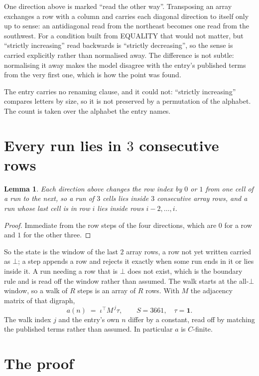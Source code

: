 \documentclass[11pt,a4paper]{article}
\theoremstyle{plain}
\newtheorem{lemma}[theorem]{Lemma}
\theoremstyle{definition}
\begin{document}
One direction above is marked ``read the other way''. Transposing an array exchanges a row with
a column and carries each diagonal direction to itself only up to sense: an antidiagonal read
from the northeast becomes one read from the southwest. For a condition built from EQUALITY
that would not matter, but ``strictly increasing'' read backwards is ``strictly decreasing'',
so the sense is carried explicitly rather than normalised away. The
difference is not subtle: normalising it away makes the model disagree with the entry's
published terms from the very first one, which is how the point was found.

The entry carries no renaming clause, and it could not: ``strictly increasing'' compares
letters by size, so it is not preserved by a permutation of the alphabet. The count is taken
over the alphabet the entry names.

\section{Every run lies in $3$ consecutive rows}

\begin{lemma}\label{lem:win}
Each direction above changes the row index by $0$ or $1$ from one cell of a run to the next, so
a run of $3$ cells lies inside $3$ consecutive array rows, and a run whose last cell is in
row $i$ lies inside rows $i-2,\dots,i$.
\end{lemma}

\begin{proof}
Immediate from the row steps of the four directions, which are $0$ for a row and $1$ for the
other three.
\end{proof}

So the state is the window of the last $2$ array rows, a row not yet written carried as
$\bot$; a step appends a row and rejects it exactly when some run ends in it or lies inside it.
A run needing a row that is $\bot$ does not exist, which is the boundary rule and is read off
the window rather than assumed. The walk starts at the all-$\bot$ window, so a walk of $R$ steps
is an array of $R$ rows. With $M$ the adjacency matrix of that digraph,
\[
a(n)\;=\;\iota^{\!\top}M^{\,j}\tau ,\qquad S=3661,\quad\tau=\mathbf{1} .
\]
The walk index $j$ and the entry's own $n$ differ by a constant, read off by matching the
published terms rather than assumed. In particular $a$ is $C$-finite.

\section{The proof}
\end{document}
